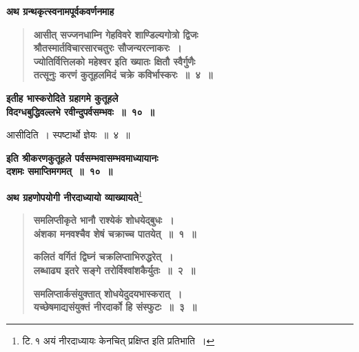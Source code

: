 \documentclass[11pt, openany]{book}
\begin{document}
{\small \textbf{अथ ग्रन्थकृत्स्वनामपूर्वकवर्णनमाह\textendash }}

 \label{10.4}
\begin{quote}
{\large \textbf{{\color{purple}आसीत् सज्जनधाम्नि गेहविवरे शाण्डिल्यगोत्रो द्विजः \\
श्रौतस्मार्तविचारसारचतुरः सौजन्यरत्नाकरः~।\\
ज्योतिर्वित्तिलको महेश्वर इति ख्यातः क्षितौ स्वैर्गुणैः \\
तत्सूनुः करणं कुतूहलमिदं चक्रे कविर्भास्करः~॥~४~॥}}}
\end{quote}

\begin{center}
{\large \textbf{इतीह भास्करोदिते ग्रहागमे कुतूहले \\
विदग्धबुद्धिवल्लभे रवीन्दुपर्वसम्भवः~॥~१०~॥}}
\end{center}

\newpage

आसीदिति~। स्पष्टार्थो ज्ञेयः~॥~४~॥
\vspace{2mm}

\begin{center}
{\large \textbf{इति श्रीकरणकुतूहले पर्वसम्भवासम्भवमाध्यायानः \\
दशमः समाप्तिमगमत्~॥~१०~॥}}
\end{center}
\vspace{2mm}

{\small \textbf{अथ ग्रहणोपयोगी नीरदाध्यायो व्याख्यायते\textendash }}\renewcommand{\thefootnote}{}\footnote{टि.\textendash \,१ अयं नीरदाध्यायः केनचित् प्रक्षिप्त इति प्रतिभाति~।}

 \label{11.1}
\begin{quote}
{\large \textbf{{\color{purple}समलिप्तीकृते भानौ राश्येकं शोधयेद्बुधः~। \\
अंशका मनवश्चैव शेषं चक्राच्च पातयेत्~॥~१~॥}}
\vspace{1mm}

 \label{11.2}
\textbf{{\color{purple}कलितं वर्गितं द्विघ्नं चक्रलिप्ताभिरुद्धरेत्~। \\
लब्धाढ्य इतरे सङ्गे तरोर्विश्वांशकैर्युतः~॥~२~॥}}
\vspace{1mm}

 \label{11.3}
\textbf{{\color{purple}समलिप्तार्कसंयुक्तात् शोधयेदुदयभास्करात्~। \\
यच्छेषमाद्यसंयुक्तं नीरदार्को हि संस्फुटः~॥~३~॥}}}
\end{quote}
\end{document}
